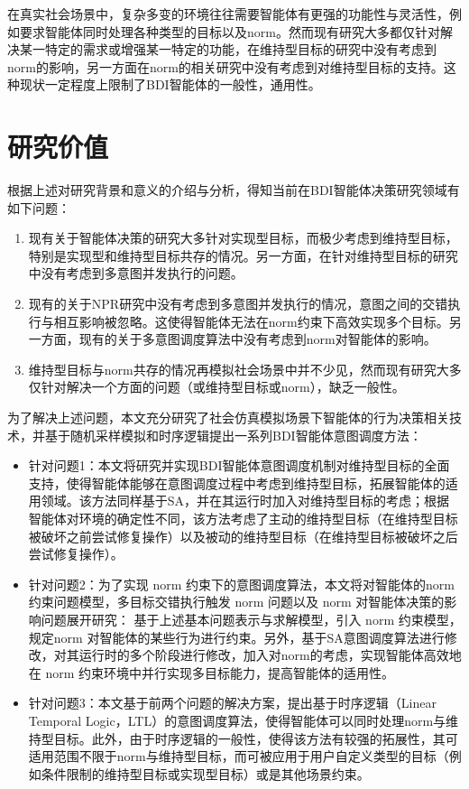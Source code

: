 在真实社会场景中，复杂多变的环境往往需要智能体有更强的功能性与灵活性，例如要求智能体同时处理各种类型的目标以及norm。然而现有研究大多都仅针对解决某一特定的需求或增强某一特定的功能，在维持型目标的研究中没有考虑到norm的影响，另一方面在norm的相关研究中没有考虑到对维持型目标的支持。这种现状一定程度上限制了BDI智能体的一般性，通用性。
\section{研究价值}
根据上述对研究背景和意义的介绍与分析，得知当前在BDI智能体决策研究领域有如下问题：
\begin{enumerate}
  \item 现有关于智能体决策的研究大多针对实现型目标，而极少考虑到维持型目标，特别是实现型和维持型目标共存的情况。另一方面，在针对维持型目标的研究中没有考虑到多意图并发执行的问题。
  \item 现有的关于NPR研究中没有考虑到多意图并发执行的情况，意图之间的交错执行与相互影响被忽略。这使得智能体无法在norm约束下高效实现多个目标。另一方面，现有的关于多意图调度算法中没有考虑到norm对智能体的影响。
  \item 维持型目标与norm共存的情况再模拟社会场景中并不少见，然而现有研究大多仅针对解决一个方面的问题（或维持型目标或norm），缺乏一般性。
\end{enumerate}

%
为了解决上述问题，本文充分研究了社会仿真模拟场景下智能体的行为决策相关技术，并基于随机采样模拟和时序逻辑提出一系列BDI智能体意图调度方法：
\begin{itemize}
  \item
针对问题1：本文将研究并实现BDI智能体意图调度机制对维持型目标的全面支持，使得智能体能够在意图调度过程中考虑到维持型目标，拓展智能体的适用领域。该方法同样基于SA，并在其运行时加入对维持型目标的考虑；根据智能体对环境的确定性不同，该方法考虑了主动的维持型目标（在维持型目标被破坏之前尝试修复操作）以及被动的维持型目标（在维持型目标被破坏之后尝试修复操作）。
  \item
针对问题2：为了实现 norm 约束下的意图调度算法，本文将对智能体的norm约束问题模型，多目标交错执行触发 norm 问题以及 norm 对智能体决策的影响问题展开研究： 基于上述基本问题表示与求解模型，引入 norm 约束模型，规定norm 对智能体的某些行为进行约束。另外，基于SA意图调度算法进行修改，对其运行时的多个阶段进行修改，加入对norm的考虑，实现智能体高效地在 norm 约束环境中并行实现多目标能力，提高智能体的适用性。
  \item
针对问题3：本文基于前两个问题的解决方案，提出基于时序逻辑（Linear Temporal Logic，LTL）的意图调度算法，使得智能体可以同时处理norm与维持型目标。此外，由于时序逻辑的一般性，使得该方法有较强的拓展性，其可适用范围不限于norm与维持型目标，而可被应用于用户自定义类型的目标（例如条件限制的维持型目标或实现型目标）或是其他场景约束。
\end{itemize}
%
